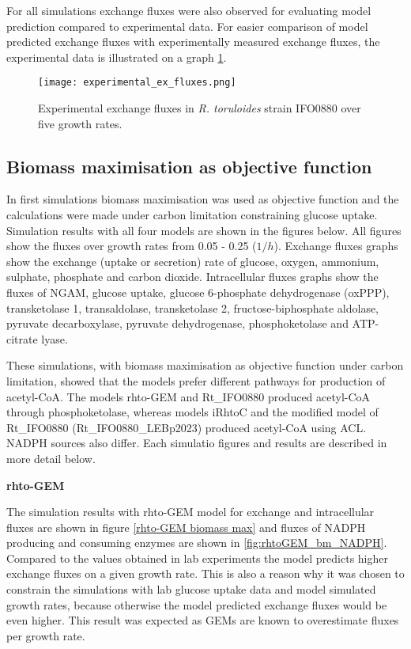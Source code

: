 For all simulations exchange fluxes were also observed
for evaluating model prediction compared to experimental data. For easier comparison of model predicted exchange fluxes with experimentally measured 
exchange fluxes,
the experimental data is illustrated on a graph \ref{experimental_ex_fluxes}.

\begin{figure}[h!]
    \centering
    \texttt{[image: experimental\_ex\_fluxes.png]}
    \caption{Experimental exchange fluxes in \textit{R. toruloides} strain IFO0880 over five growth rates.}
    \label{experimental_ex_fluxes}
\end{figure}


\subsection{Biomass maximisation as objective function}

In first simulations biomass maximisation was used as objective function and the calculations were made under carbon limitation constraining glucose 
uptake. Simulation results with all four models are shown in the figures below. All figures show the fluxes over growth rates from 0.05 - 0.25 ($1/h$).
Exchange fluxes graphs show the exchange (uptake or secretion) rate of glucose, oxygen, ammonium, sulphate, phosphate and carbon dioxide.
Intracellular fluxes graphs show the fluxes of NGAM, glucose uptake, glucose 6-phosphate dehydrogenase (oxPPP), transketolase 1, transaldolase, 
transketolase 2, 
fructose-biphosphate aldolase, pyruvate decarboxylase, pyruvate dehydrogenase, phosphoketolase and ATP-citrate lyase.

These simulations, with biomass maximisation as objective function under carbon limitation, showed that the models prefer different pathways for 
production of acetyl-CoA. The models rhto-GEM and Rt\_IFO0880 produced acetyl-CoA through phosphoketolase, whereas models iRhtoC and the modified model 
of Rt\_IFO0880 (Rt\_IFO0880\_LEBp2023) produced acetyl-CoA using ACL. NADPH sources also differ. Each simulatio figures and results are described in more detail below.



\textbf{rhto-GEM}

The simulation results with rhto-GEM model for exchange and intracellular fluxes are shown in figure \ref{rhto-GEM biomass max} and fluxes of NADPH 
producing and consuming enzymes are shown in \ref{fig:rhtoGEM_bm_NADPH}. Compared to the values obtained in lab experiments the model predicts higher exchange fluxes 
on a given growth rate. This is also a reason why it was chosen to constrain the simulations with lab glucose uptake data and model simulated growth rates, because 
otherwise the model predicted exchange fluxes would be even higher. This result was expected as GEMs are known to overestimate fluxes per growth rate.

